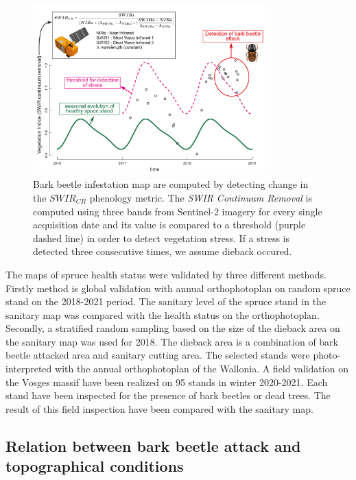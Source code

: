 \documentclass[3p,procedia]{elsarticle}
\begin{document}
\begin{figure}[htbp] 
	\centering
	\includegraphics[width=0.8\textwidth]{fctHarmo.png}
	\caption{Bark beetle infestation map are computed by detecting change in the $SWIR_{CR}$ phenology metric. The \textit{SWIR Continuum Removal} is computed using three bands from Sentinel-2 imagery for every single acquisition date and its value is compared to a threshold (purple dashed line) in order to detect vegetation stress. If a stress is detected three consecutive times, we assume dieback occured.}
	\label{fig:harmo}
\end{figure}


The maps of spruce health status were validated by three different methods.
Firstly method is global validation with annual orthophotoplan on random spruce stand on the 2018-2021 period. The sanitary level of the spruce stand in the sanitary map was compared with the health status on the orthophotoplan.
Secondly, a stratified random sampling based on the size of the dieback area on the sanitary map was used for 2018.
The dieback area is a combination of bark beetle attacked area and sanitary cutting area. 
The selected stands were photo-interpreted with the annual orthophotoplan of the Wallonia.
A field validation on the Vosges massif have been realized on 95 stands in winter 2020-2021.
Each stand have been inspected for the presence of bark beetles or dead trees. 
The result of this field inspection have been compared with the sanitary map. 



\subsection{Relation between bark beetle attack and topographical conditions}
\end{document}
